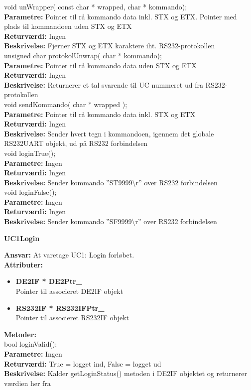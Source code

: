 void unWrapper( const char * wrapped, char * kommando); \\
\textbf{Parametre:} Pointer til rå kommando data inkl. STX og ETX. Pointer med plads til kommandoen uden STX og ETX \\
\textbf{Returværdi:} Ingen \\
\textbf{Beskrivelse:} Fjerner STX og ETX karaktere iht. RS232-protokollen\\

unsigned char protokolUnwrap( char * kommando); \\
\textbf{Parametre:} Pointer til rå kommando data uden STX og ETX \\
\textbf{Returværdi:} Ingen \\
\textbf{Beskrivelse:} Returnerer et tal svarende til UC nummeret ud fra RS232-protokollen \\

void sendKommando( char * wrapped ); \\
\textbf{Parametre:} Pointer til rå kommando data inkl. STX og ETX \\
\textbf{Returværdi:} Ingen \\
\textbf{Beskrivelse:} Sender hvert tegn i kommandoen, igennem det globale RS232UART objekt, ud på RS232 forbindelsen\\

void loginTrue(); \\
\textbf{Parametre:} Ingen \\
\textbf{Returværdi:} Ingen \\
\textbf{Beskrivelse:} Sender kommando ''ST9999\textbackslash r'' over RS232 forbindelsen\\

void loginFalse(); \\
\textbf{Parametre:} Ingen \\
\textbf{Returværdi:} Ingen \\
\textbf{Beskrivelse:} Sender kommando ''SF9999\textbackslash r'' over RS232 forbindelsen\\

%
%
{\centering
\textbf{UC1Login}\par
}
\textbf{Ansvar:} At varetage UC1: Login forløbet. \\
\textbf{Attributer:}
\begin{itemize}
	\item \textbf{DE2IF * DE2Ptr\_} \\
	Pointer til associeret DE2IF objekt
	\item \textbf{RS232IF * RS232IFPtr\_} \\
	Pointer til associeret RS232IF objekt
\end{itemize}
\textbf{Metoder:} \\
bool loginValid(); \\
\textbf{Parametre:} Ingen \\
\textbf{Returværdi:} True = logget ind, False = logget ud \\
\textbf{Beskrivelse:} Kalder getLoginStatus() metoden i DE2IF objektet og returnerer værdien her fra \\

